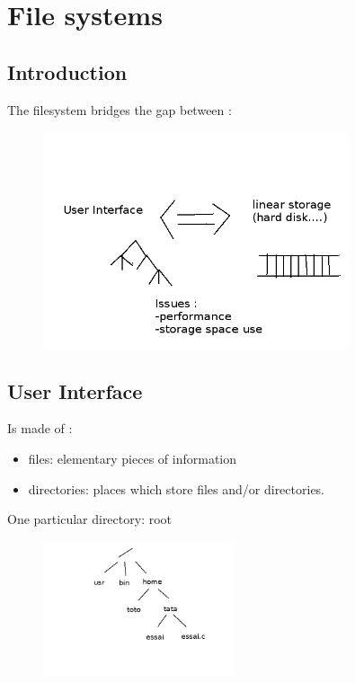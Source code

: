 \chapter{File systems}

\section{Introduction}

The filesystem bridges the gap between :
\begin{figure}[h!]
  \begin{center}
    \includegraphics[width=0.8\textwidth]{filesystem.png}
  \end{center}
\end{figure}

\section{User Interface}

Is made of :

\begin{itemize}
  \item files: elementary pieces of information
  \item directories: places which store files and/or directories.
\end{itemize}
  
  One particular directory: root
  \begin{figure}[h!]
  \begin{center}
    \includegraphics[width=0.5\textwidth]{root.png}
  \end{center}
\end{figure}
  
